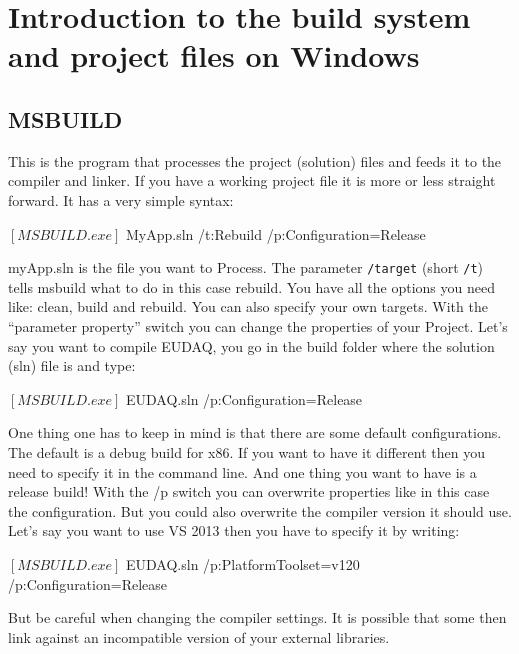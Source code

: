 \section{Introduction to the build system and project files on Windows}
\label{app:compileOnWindows}

\subsection{MSBUILD}

This is the program that processes the project (solution) files and feeds it to the compiler and linker. If you have a working project file it is more or less straight forward. It has a very simple syntax:

      \begin{listing}[mybash]
$[MSBUILD.exe]$ MyApp.sln /t:Rebuild /p:Configuration=Release
\end{listing}

myApp.sln is the file you want to Process. The parameter
\texttt{/target} (short \texttt{/t}) tells msbuild what to do in this
case rebuild. You have all the options you need like: clean, build and
rebuild. You can also specify your own targets. With the ``parameter
property'' switch you can change the properties of your Project. Let's
say you want to compile EUDAQ, you go in the build folder where the solution (sln) file is and type:

      \begin{listing}[mybash]
$[MSBUILD.exe]$ EUDAQ.sln /p:Configuration=Release 
\end{listing}

One thing one has to keep in mind is that there are some default
configurations. The default is a debug build for x86. If you want to
have it different then you need to specify it in the command line. And
one thing you want to have is a release build! With the /p switch you
can overwrite properties like in this case the configuration. But you
could also overwrite the compiler version it should use. Let's say you
want to use VS 2013 then you have to specify it by writing:

      \begin{listing}[mybash]
$[MSBUILD.exe]$ EUDAQ.sln /p:PlatformToolset=v120 /p:Configuration=Release
\end{listing}

But be careful when changing the compiler settings. It is possible that some then link against an incompatible version of your external libraries. 

